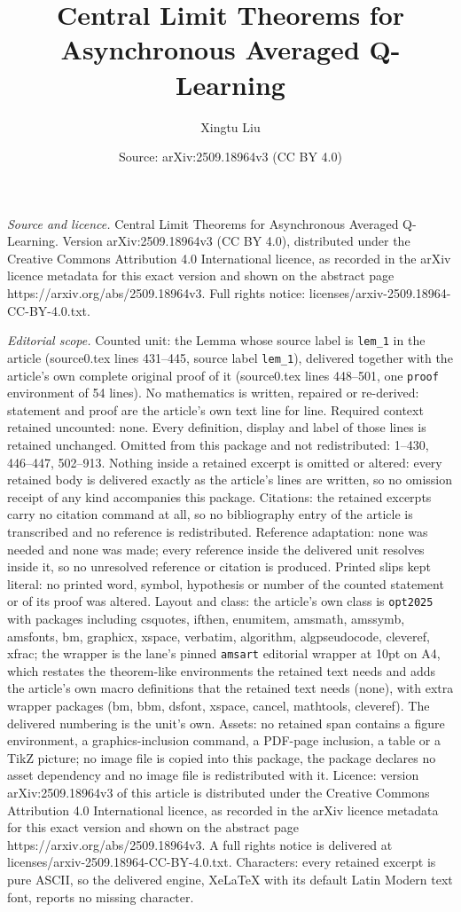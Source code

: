 \documentclass[10pt,a4paper]{amsart}
\title[Central Limit Theorems for Asynchronous Averaged Q-Learning]{Central Limit Theorems for Asynchronous Averaged Q-Learning}
\author{Xingtu Liu}
\date{Source: arXiv:2509.18964v3 (CC BY 4.0)}
\begin{document}
\maketitle

\noindent\emph{Source and licence.} Central Limit Theorems for Asynchronous Averaged Q-Learning. Version arXiv:2509.18964v3 (CC BY 4.0), distributed under the Creative Commons Attribution 4.0 International licence, as recorded in the arXiv licence metadata for this exact version and shown on the abstract page https://arxiv.org/abs/2509.18964v3. Full rights notice: licenses/arxiv-2509.18964-CC-BY-4.0.txt.\par\smallskip

\noindent\textit{Editorial scope.} Counted unit: the Lemma whose source label is \texttt{lem\_1} in the article (source0.tex lines 431--445, source label \texttt{lem\_1}), delivered together with the article's own complete original proof of it (source0.tex lines 448--501, one \texttt{proof} environment of 54 lines). No mathematics is written, repaired or re-derived: statement and proof are the article's own text line for line. Required context retained uncounted: none. Every definition, display and label of those lines is retained unchanged. Omitted from this package and not redistributed: 1--430, 446--447, 502--913. Nothing inside a retained excerpt is omitted or altered: every retained body is delivered exactly as the article's lines are written, so no omission receipt of any kind accompanies this package. Citations: the retained excerpts carry no citation command at all, so no bibliography entry of the article is transcribed and no reference is redistributed. Reference adaptation: none was needed and none was made; every reference inside the delivered unit resolves inside it, so no unresolved reference or citation is produced. Printed slips kept literal: no printed word, symbol, hypothesis or number of the counted statement or of its proof was altered. Layout and class: the article's own class is \texttt{opt2025} with packages including csquotes, ifthen, enumitem, amsmath, amssymb, amsfonts, bm, graphicx, xspace, verbatim, algorithm, algpseudocode, cleveref, xfrac; the wrapper is the lane's pinned \texttt{amsart} editorial wrapper at 10pt on A4, which restates the theorem-like environments the retained text needs and adds the article's own macro definitions that the retained text needs (none), with extra wrapper packages (bm, bbm, dsfont, xspace, cancel, mathtools, cleveref). The delivered numbering is the unit's own. Assets: no retained span contains a figure environment, a graphics-inclusion command, a PDF-page inclusion, a table or a TikZ picture; no image file is copied into this package, the package declares no asset dependency and no image file is redistributed with it. Licence: version arXiv:2509.18964v3 of this article is distributed under the Creative Commons Attribution 4.0 International licence, as recorded in the arXiv licence metadata for this exact version and shown on the abstract page https://arxiv.org/abs/2509.18964v3. A full rights notice is delivered at licenses/arxiv-2509.18964-CC-BY-4.0.txt. Characters: every retained excerpt is pure ASCII, so the delivered engine, XeLaTeX with its default Latin Modern text font, reports no missing character.
\end{document}
